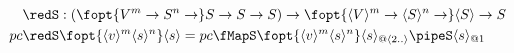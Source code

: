 \documentclass[preview]{standalone}
\begin{document}
\begin{align*}%
    \redS &: (\fopt{V^m \rightarrow S^n \rightarrow} S \rightarrow S \rightarrow S) \rightarrow \fopt{\vect{V}^m \rightarrow \vect{S}^n \rightarrow} \vect{S} \rightarrow S\\
    pc \redS & \fopt{\vect{v}^m \vect{s}^n} \vect{s} =%
                pc \fMapS \fopt{\vect{v}^m \vect{s}^n} \vect{s}_{@\vect{2..}} \pipeS \vect{s}_{@1}%
\end{align*}
\end{document}
